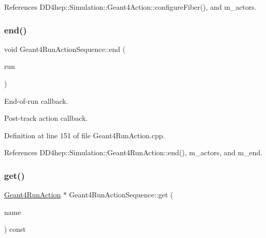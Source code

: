 References D\+D4hep\+::\+Simulation\+::\+Geant4\+Action\+::configure\+Fiber(), and m\+\_\+actors.

\hypertarget{class_d_d4hep_1_1_simulation_1_1_geant4_run_action_sequence_a2a21cad772d05ac39502c35e334c6e5f}{}\label{class_d_d4hep_1_1_simulation_1_1_geant4_run_action_sequence_a2a21cad772d05ac39502c35e334c6e5f} 
\subsubsection{\texorpdfstring{end()}{end()}}
{\footnotesize\ttfamily void Geant4\+Run\+Action\+Sequence\+::end (\begin{DoxyParamCaption}\item[{const G4\+Run $\ast$}]{run }\end{DoxyParamCaption})\hspace{0.3cm}{\ttfamily [virtual]}}



End-\/of-\/run callback. 

Post-\/track action callback. 

Definition at line 151 of file Geant4\+Run\+Action.\+cpp.



References D\+D4hep\+::\+Simulation\+::\+Geant4\+Run\+Action\+::end(), m\+\_\+actors, and m\+\_\+end.

\hypertarget{class_d_d4hep_1_1_simulation_1_1_geant4_run_action_sequence_acabb383c59fa2e37bb98a13501443e0b}{}\label{class_d_d4hep_1_1_simulation_1_1_geant4_run_action_sequence_acabb383c59fa2e37bb98a13501443e0b} 
\subsubsection{\texorpdfstring{get()}{get()}}
{\footnotesize\ttfamily \hyperlink{class_d_d4hep_1_1_simulation_1_1_geant4_run_action}{Geant4\+Run\+Action} $\ast$ Geant4\+Run\+Action\+Sequence\+::get (\begin{DoxyParamCaption}\item[{const std\+::string \&}]{name }\end{DoxyParamCaption}) const}



